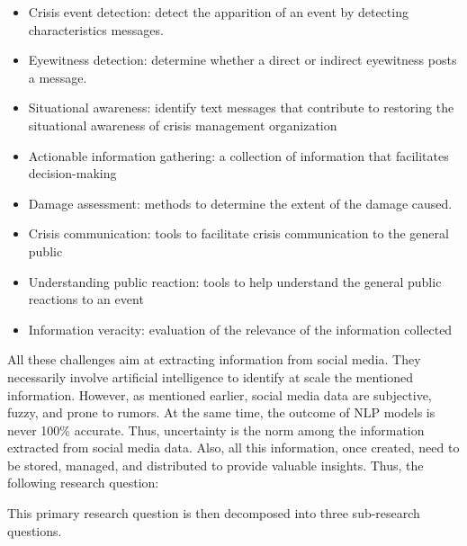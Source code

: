 \begin{itemize}
    \item Crisis event detection: detect the apparition of an event by detecting characteristics messages.
    \item Eyewitness detection: determine whether a direct or indirect eyewitness posts a message.
    \item Situational awareness: identify text messages that contribute to restoring the situational awareness of crisis management organization
    \item Actionable information gathering: a collection of information that facilitates decision-making
    \item Damage assessment: methods to determine the extent of the damage caused.
    \item Crisis communication: tools to facilitate crisis communication to the general public
    \item Understanding public reaction: tools to help understand the general public reactions to an event
    \item Information veracity: evaluation of the relevance of the information collected
\end{itemize}

All these challenges aim at extracting information from social media.
They necessarily involve artificial intelligence to identify at scale the mentioned information.
However, as mentioned earlier, social media data are subjective, fuzzy, and prone to rumors.
At the same time, the outcome of NLP models is never 100\% accurate.
Thus, uncertainty is the norm among the information extracted from social media data.
Also, all this information, once created, need to be stored, managed, and distributed to provide valuable insights.
Thus, the following research question:

\begin{center}
\end{center}

This primary research question is then decomposed into three sub-research questions.

